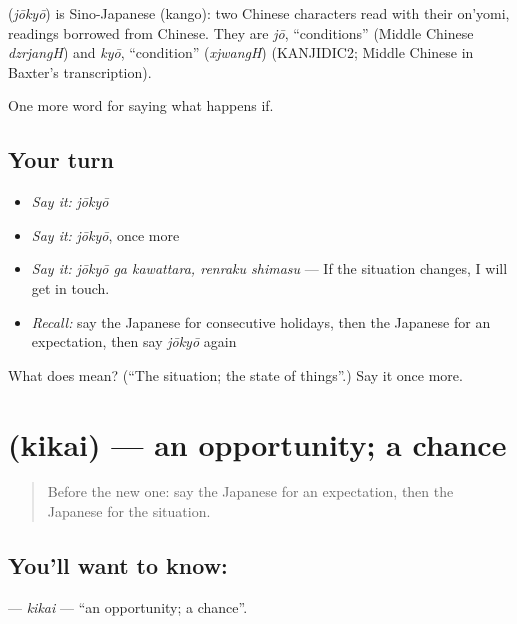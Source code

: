 \begin{cousinweb}
\textbf{} (\emph{jōkyō}) is Sino-Japanese (kango): two Chinese characters read with their on'yomi, readings borrowed from Chinese. They are \emph{jō}, \textquotedblleft{}conditions\textquotedblright{} (Middle Chinese \emph{dzrjangH}) and \emph{kyō}, \textquotedblleft{}condition\textquotedblright{} (\emph{xjwangH}) (KANJIDIC2; Middle Chinese in Baxter's transcription).
\end{cousinweb}

\begin{grammarlens}[title={What you've built}]
One more word for saying what happens if.
\end{grammarlens}

\subsection*{Your turn}
\begin{itemize}
\raggedright
  \item \emph{Say it:} \emph{jōkyō}
  \item \emph{Say it:} \emph{jōkyō}, once more
  \item \emph{Say it:} \emph{jōkyō ga kawattara, renraku shimasu} — If the situation changes, I will get in touch.
  \item \emph{Recall:} say the Japanese for consecutive holidays, then the Japanese for an expectation, then say \emph{jōkyō} again
\end{itemize}

\begin{tcolorbox}[breakable,colback=teal!4,colframe=teal!35!black,title={Before you move on}]
What does  mean? (\textquotedblleft{}The situation; the state of things\textquotedblright{}.) Say it once more.
\end{tcolorbox}
\section[\texorpdfstring{\ja{きかい} (kikai)}{きかい (kikai)}]{ (kikai) — an opportunity; a chance}

\label{lesson:JA-C349-kikai}



\begin{quote}
Before the new one: say the Japanese for an expectation, then the Japanese for the situation.
\end{quote}

\subsection*{You'll want to know: }
\textbf{} — \emph{kikai} — \textquotedblleft{}an opportunity; a chance\textquotedblright{}.

